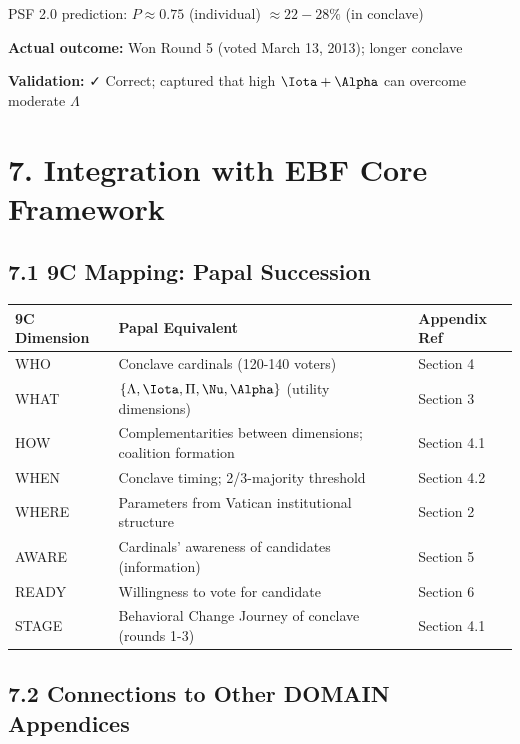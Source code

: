 \documentclass[11pt]{article}
\begin{document}
PSF 2.0 prediction: $P \approx 0.75$ (individual) $\approx 22-28\%$ (in conclave)

\textbf{Actual outcome:} Won Round 5 (voted March 13, 2013); longer conclave

\textbf{Validation:} ✓ Correct; captured that high $\Iota + \Alpha$ can overcome moderate $\Lambda$

\section{7. Integration with EBF Core Framework}

\subsection{7.1 9C Mapping: Papal Succession}

\begin{table}[h]
\centering
\begin{tabular}{|l|l|l|}
\hline
\textbf{9C Dimension} & \textbf{Papal Equivalent} & \textbf{Appendix Ref} \\
\hline
WHO & Conclave cardinals (120-140 voters) & Section 4 \\
WHAT & $\{\Lambda, \Iota, \Pi, \Nu, \Alpha\}$ (utility dimensions) & Section 3 \\
HOW & Complementarities between dimensions; coalition formation & Section 4.1 \\
WHEN & Conclave timing; 2/3-majority threshold & Section 4.2 \\
WHERE & Parameters from Vatican institutional structure & Section 2 \\
AWARE & Cardinals' awareness of candidates (information) & Section 5 \\
READY & Willingness to vote for candidate & Section 6 \\
STAGE & Behavioral Change Journey of conclave (rounds 1-3) & Section 4.1 \\
\hline
\end{tabular}
\end{table}

\subsection{7.2 Connections to Other DOMAIN Appendices}
\end{document}
